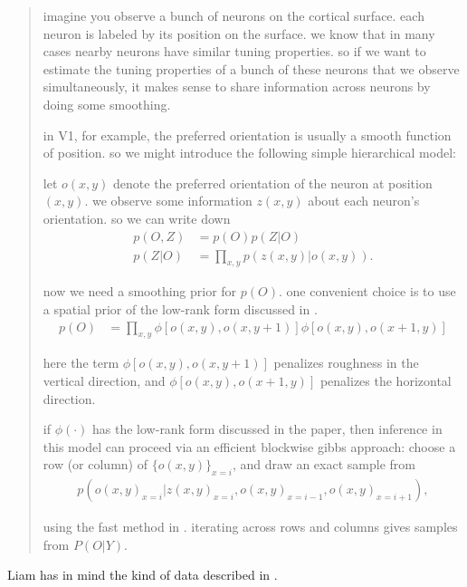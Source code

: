 \documentclass[11pt]{article}
\newcommand{\paperlink}[1]{\href{../../../../papers/#1.pdf}{\cite{#1}}}
\begin{document}
\begin{quotation}
\noindent imagine you observe a bunch of neurons on the cortical surface.  each neuron is labeled by its position on the surface.  we know that in many cases nearby neurons have similar tuning properties.  so if we want to estimate the tuning properties of a bunch of these neurons that we observe simultaneously, it makes sense to share information across neurons by doing some smoothing.  

in V1, for example, the preferred orientation is usually a smooth function of position.  so we might introduce the following simple hierarchical model:

let $o(x,y)$ denote the preferred orientation of the neuron at position $(x,y)$.  we observe some information $z(x,y)$ about each neuron's orientation.  so we can write down
%
\begin{align*}
p(O,Z) &= p(O) p(Z|O) \\
p(Z|O) &= \prod_{x,y} p( z(x,y) | o(x,y) ).
\end{align*}

\noindent now we need a smoothing prior for $p(O)$.  one convenient choice is to use a spatial prior of the low-rank form discussed in \paperlink{Smith_2012}.
%
\begin{align*}
p(O) &= \prod_{x,y} \phi[o(x,y),o(x,y+1)] \phi[o(x,y),o(x+1,y)]
\end{align*}

\noindent here the term $\phi[o(x,y),o(x,y+1)]$ penalizes roughness in the vertical direction, and $\phi[o(x,y),o(x+1,y)]$ penalizes the horizontal direction.

if $\phi(\cdot)$ has the low-rank form discussed in the paper, then inference in this model can proceed via an efficient blockwise gibbs approach: choose a row (or column) of $\{o(x,y)\}_{x=i}$, and draw an exact sample from 
%
\begin{align*}
p( {o(x,y)}_{x=i} | {z(x,y)}_{x=i}, {o(x,y)}_{x=i-1}, {o(x,y)}_{x=i+1} ),
\end{align*}

\noindent using the fast method in \paperlink{Smith_2012}.  iterating across rows and columns gives samples from $P(O|Y)$.
\end{quotation}

Liam has in mind the kind of data described in \paperlink{Ohki_2006}.




\end{document}
